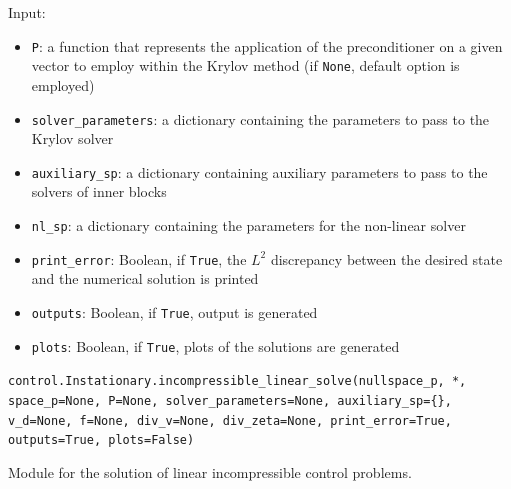 \documentclass[letterpaper,10pt,english]{sphinxmanual}
\begin{document}
Input:
\begin{itemize}
\item \texttt{P}: a function that represents the application of the
            preconditioner on a given vector to employ within the Krylov
            method (if \texttt{None}, default option is employed)

\item \texttt{solver{\_}parameters}: a dictionary containing the parameters to pass
            to the Krylov solver

\item \texttt{auxiliary{\_}sp}: a dictionary containing auxiliary parameters to
            pass to the solvers of inner blocks

\item \texttt{nl{\_}sp}: a dictionary containing the parameters for the non-linear
            solver

\item \texttt{print{\_}error}: Boolean, if \texttt{True}, the $L^2$ discrepancy between the desired state and the numerical solution is printed

\item \texttt{outputs}: Boolean, if \texttt{True}, output is generated

\item \texttt{plots}: Boolean, if \texttt{True}, plots of the solutions are generated
\end{itemize}

\vspace{3ex}

\texttt{control.Instationary.incompressible{\_}linear{\_}solve(nullspace{\_}p, *, space{\_}p=None, P=None, solver{\_}parameters=None, auxiliary{\_}sp=\{\}, v{\_}d=None, f=None, div{\_}v=None, div{\_}zeta=None, print{\_}error=True, outputs=True, plots=False)}

Module for the solution of linear incompressible control problems.
\end{document}
